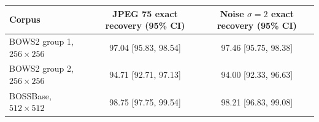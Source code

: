 \begin{tabular}{lcc}
\toprule
Corpus & JPEG 75 exact recovery (95\% CI) & Noise $\sigma=2$ exact recovery (95\% CI) \\
\midrule
BOWS2 group 1, $256\times256$ & 97.04 [95.83, 98.54] & 97.46 [95.75, 98.38] \\
BOWS2 group 2, $256\times256$ & 94.71 [92.71, 97.13] & 94.00 [92.33, 96.63] \\
BOSSBase, $512\times512$ & 98.75 [97.75, 99.54] & 98.21 [96.83, 99.08] \\
\bottomrule
\end{tabular}
